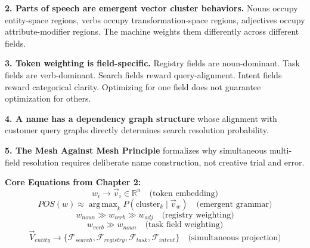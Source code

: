 \documentclass[12pt, openany]{book}
\theoremstyle{thmstyle}
\theoremstyle{defstyle}
\DeclareMathOperator*{\argmax}{arg\,max}
\begin{document}
\textbf{2. Parts of speech are emergent vector cluster behaviors.} Nouns occupy entity-space regions, verbs occupy transformation-space regions, adjectives occupy attribute-modifier regions. The machine weights them differently across different fields.

\textbf{3. Token weighting is field-specific.} Registry fields are noun-dominant. Task fields are verb-dominant. Search fields reward query-alignment. Intent fields reward categorical clarity. Optimizing for one field does not guarantee optimization for others.

\textbf{4. A name has a dependency graph structure} whose alignment with customer query graphs directly determines search resolution probability.

\textbf{5. The Mesh Against Mesh Principle} formalizes why simultaneous multi-field resolution requires deliberate name construction, not creative trial and error.

\begin{equationbox}
\textbf{Core Equations from Chapter 2:}
\[
w_i \rightarrow \vec{v}_i \in \mathbb{R}^n \quad \text{(token embedding)}
\]
\[
POS(w) \approx \argmax_k P(\text{cluster}_k \mid \vec{v}_w) \quad \text{(emergent grammar)}
\]
\[
w_{noun} \gg w_{verb} \gg w_{adj} \quad \text{(registry weighting)}
\]
\[
w_{verb} \gg w_{noun} \quad \text{(task field weighting)}
\]
\[
\vec{V}_{entity} \rightarrow \{\mathcal{F}_{search}, \mathcal{F}_{registry}, \mathcal{F}_{task}, \mathcal{F}_{intent}\} \quad \text{(simultaneous projection)}
\]
\end{equationbox}
\end{document}
